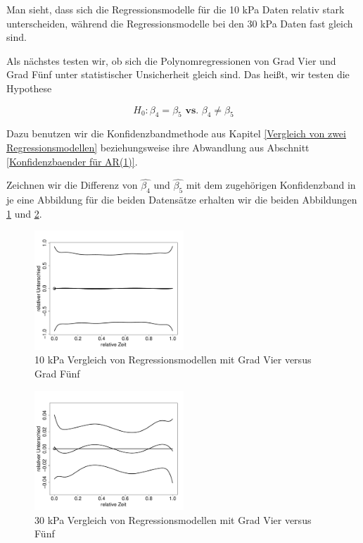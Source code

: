 \documentclass[12pt,a4paper]{article}
\theoremstyle{definition}
\theoremstyle{definition}
\theoremstyle{definition}
\theoremstyle{definition}
\begin{document}
Man sieht, dass sich die Regressionsmodelle für die 10 kPa Daten relativ stark unterscheiden, während die Regressionsmodelle bei den 30 kPa Daten fast gleich sind.

Als nächstes testen wir, ob sich die Polynomregressionen von Grad Vier und Grad Fünf unter statistischer Unsicherheit gleich sind. Das heißt, wir testen die Hypothese

\begin{equation*}
H_0 : \beta_{4} = \beta_{5} \textbf{ vs. } \beta_4 \neq \beta_{5}
\end{equation*}

Dazu benutzen wir die Konfidenzbandmethode aus Kapitel \ref{Vergleich von zwei Regressionsmodellen} beziehungsweise ihre Abwandlung aus Abschnitt \ref{Konfidenzbaender für AR(1)}.

Zeichnen wir die Differenz von $\hat{\beta_4}$ und $\hat{\beta_5}$ mit dem zugehörigen Konfidenzband in je eine Abbildung für die beiden Datensätze erhalten wir die beiden Abbildungen \ref{10kPa-Regmod-4-5} und \ref{30kPa-Regmod-4-5}.

\begin{figure}[H] 
  \centering
     \includegraphics[width=0.5\textwidth]{10kPa-poly-KB-4-5.pdf}
  \caption{10 kPa Vergleich von Regressionsmodellen mit Grad Vier versus Grad Fünf}
  \label{10kPa-Regmod-4-5}
\end{figure}

\begin{figure}[H] 
  \centering
     \includegraphics[width=0.5\textwidth]{30kPa-poly-KB-4-5.pdf}
  \caption{30 kPa Vergleich von Regressionsmodellen mit Grad Vier versus Fünf}
  \label{30kPa-Regmod-4-5}
\end{figure}
\end{document}
